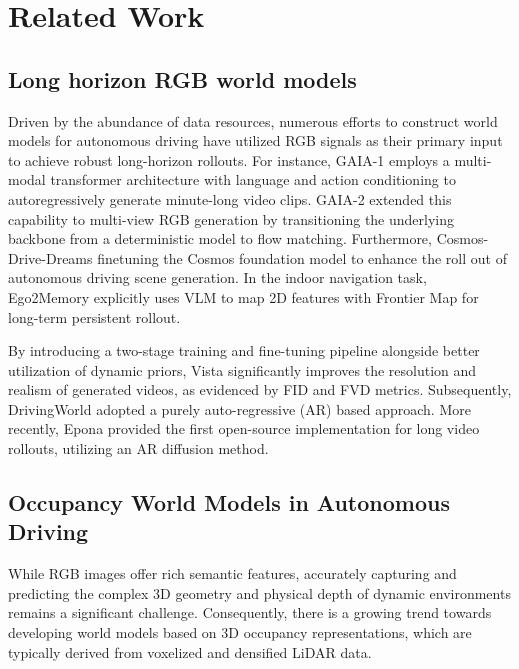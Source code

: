 \section{Related Work}

\subsection{Long horizon RGB world models}

Driven by the abundance of data resources, numerous efforts to construct world models for autonomous driving have utilized RGB signals as their primary input to achieve robust long-horizon rollouts. For instance, GAIA-1 \cite{hu2023gaia} employs a multi-modal transformer architecture with language and action conditioning to autoregressively generate minute-long video clips. GAIA-2 \cite{russell2025gaia} extended this capability to multi-view RGB generation by transitioning the underlying backbone from a deterministic model to flow matching. Furthermore, Cosmos-Drive-Dreams \cite{ren2025cosmos} finetuning the Cosmos \cite{agarwal2025cosmos} foundation model to enhance the roll out of autonomous driving scene generation. In the indoor navigation task, Ego2Memory \cite{zhang2025mem2ego} explicitly uses VLM to map 2D features with Frontier Map for long-term persistent rollout.

By introducing a two-stage training and fine-tuning pipeline alongside better utilization of dynamic priors, Vista \cite{gao2024vista} significantly improves the resolution and realism of generated videos, as evidenced by FID and FVD metrics. Subsequently, DrivingWorld \cite{hu2024drivingworld} adopted a purely auto-regressive (AR) based approach. More recently, Epona \cite{zhang2025epona} provided the first open-source implementation for long video rollouts, utilizing an AR diffusion method.

\subsection{Occupancy World Models in Autonomous Driving}

While RGB images offer rich semantic features, accurately capturing and predicting the complex 3D geometry and physical depth of dynamic environments remains a significant challenge. Consequently, there is a growing trend towards developing world models based on 3D occupancy representations, which are typically derived from voxelized and densified LiDAR data.

